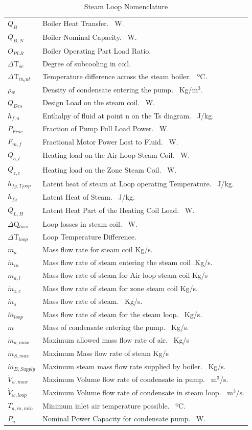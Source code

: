 \begin{longtable}[c]{p{1.0in}p{4.0in}}
\caption{  Steam Loop Nomenclature \protect \label{table:steam-loop-nomenclature}}\\
\toprule 
\({Q_{B}}\) & Boiler Heat Transfer.~ W. \tabularnewline
\({Q_{B,N}}\) & Boiler Nominal Capacity.~ W. \tabularnewline
\({O_{PLR}}\) & Boiler Operating Part Load Ratio.~ \tabularnewline
\(\Delta\)T\(_{sc}\) & Degree of subcooling in coil.~ \tabularnewline
\(\Delta\)T\(_{in_out}\) & Temperature difference across the steam boiler.~ ºC. \tabularnewline
\(\rho\)\(_{w}\) & Density of condensate entering the pump.~ Kg/m\(^3\).~ \tabularnewline
\(Q_{Des}\) & Design Load on the steam coil.~ W. \tabularnewline
\(h_{f,n}\) & Enthalpy of fluid at point n on the Ts diagram.~ J/kg. \tabularnewline
\(P_{Frac}\) & Fraction of Pump Full Load Power.~ W. \tabularnewline
\(F_{m,f}\) & Fractional Motor Power Lost to Fluid.~ W. \tabularnewline
\(Q_{a,l}\) & Heating load on the Air Loop Steam Coil.~ W. \tabularnewline
\(Q_{z,c}\) & Heating load on the Zone Steam Coil.~ W. \tabularnewline
\(h_{fg,T_loop}\) & Latent heat of steam at Loop operating Temperature.~ J/kg. \tabularnewline
\(h_{fg}\) & Latent Heat of Steam.~ J/kg. \tabularnewline
\(Q_{L,H}\) & Latent Heat Part of the Heating Coil Load.~ W. \tabularnewline
\(\Delta\)Q\(_{loss}\) & Loop losses in steam coil.~ W. \tabularnewline
\(\Delta\)T\(_{loop}\) & Loop Temperature Difference. \tabularnewline
\(\dot m_{a}\) & Mass flow rate for steam coil Kg/s. \tabularnewline
\(\dot m_{in}\) & Mass flow rate of steam entering the steam coil .Kg/s. \tabularnewline
\(\dot m_{a,l}\) & Mass flow rate of steam for Air loop steam coil Kg/s \tabularnewline
\(\dot m_{z,c}\) & Mass flow rate of steam for zone steam coil Kg/s. \tabularnewline
\(\dot m_{s}\) & Mass flow rate of steam.~ Kg/s. \tabularnewline
\(\dot m_{loop}\) & Mass flow rate of steam for the steam loop.~ Kg/s. \tabularnewline
\(\dot m\) & Mass of condensate entering the pump.~ Kg/s. \tabularnewline
\(\dot m_{a,max}\) & Maximum allowed mass flow rate of air.~ Kg/s \tabularnewline
\(\dot m_{S,max}\) & Maximum Mass flow rate of steam Kg/s \tabularnewline
\(\dot m_{B,Supply}\) & Maximum steam mass flow rate supplied by boiler.~ Kg/s. \tabularnewline
\(\dot V_{w,max}\) & Maximum Volume flow rate of condensate in pump.~ m\(^3\)/s. \tabularnewline
\(\dot V_{w,loop}\) & Maximum Volume flow rate of condensate in steam loop.~ m\(^3\)/s. \tabularnewline
\(T_{a,in,min}\) & Minimum inlet air temperature possible.~ ºC. \tabularnewline
\(P_{n}\) & Nominal Power Capacity for condensate pump.~ W. \tabularnewline

\end{longtable}
